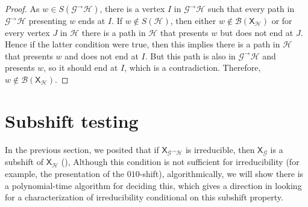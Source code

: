 \documentclass[hidelinks]{article}
\newcommand{\Gc}{\mathcal{G}}  %
\newcommand{\Hc}{\mathcal{H}}  %
\newcommand{\Bc}{\mathcal{B}}
\newcommand{\GtH}{{\Gc^\to\Hc}}
\newcommand{\shift}[1]{\mathsf{X}_{#1}}
\theoremstyle{definition}
\begin{document}
\begin{proof}
    As \(w \in S(\GtH)\), there is a vertex \(I\) in \(\GtH\) such that every path in 
    \(\GtH\) presenting \(w\) ends at \(I\).
    If \(w \notin S(\Hc)\), then either 
    \(w \notin \Bc(\shift{\Hc})\) or for every vertex \(J\) in \(\Hc\) there is a path
    in \(\Hc\) that presents \(w\) but does not end at \(J\). Hence if the latter 
    condition were true, then this implies there is a path in \(\Hc\) that presents \(w\) 
    and does not end at \(I\). But this path is also in \(\GtH\) and presents \(w\), so it 
    should end at \(I\), which is a contradiction. Therefore, \(w \notin \Bc(\shift{\Hc})\).
\end{proof}



\section{Subshift testing}

In the previous section, we posited that if \(\shift{\GtH}\) is irreducible, then \(\shift{\Gc}\) is a subshift of \(\shift{\Hc}\) (),
Although this condition is not sufficient for irreducibility (for example, the presentation of the \(010\)-shift), algorithmically, we will show there is a 
polynomial-time algorithm for deciding this, which gives a direction in looking for 
a characterization of irreducibility conditional on this subshift property.
\end{document}
